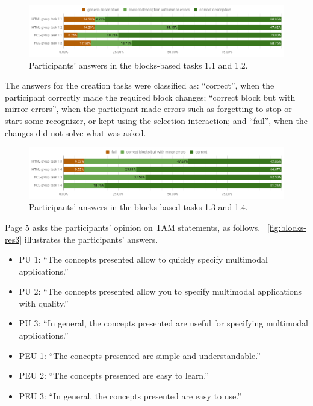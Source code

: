 \documentclass[
  doutorado,
  american
]{ThesisPUC}
\newcommand{\fig}[1]{\figurename~\ref{#1}}
\newcommand{\captionvspace}{\vspace{-1.3em}}
\begin{document}
\begin{figure}[!ht]
\begin{center}
	\includegraphics[width=14cm, keepaspectratio]{img/img20.png}
    \captionvspace
	\caption{Participants’ answers in the blocks-based tasks 1.1 and 1.2.}
	\label{fig:blocks-res1}
    \captionvspace
\end{center}
\end{figure}

The answers for the creation tasks were classified as: “correct”, when the
participant correctly made the required block changes; “correct block but with
mirror errors”, when the participant made errors such as forgetting to stop or
start some recognizer, or kept using the selection interaction; and “fail”, when
the changes did not solve what was asked.

\begin{figure}[!ht]
\begin{center}
	\includegraphics[width=14cm, keepaspectratio]{img/img21.png}
    \captionvspace
	\caption{Participants’ answers in the blocks-based tasks 1.3 and 1.4.}
	\label{fig:blocks-res2}
    \captionvspace
\end{center}
\end{figure}

Page 5 asks the participants’ opinion on TAM statements, as follows. 	
\fig{fig:blocks-res3} illustrates the participants’ answers.

\begin{itemize}
	\item PU 1: “The concepts presented allow to quickly specify multimodal
	applications.”
	\item PU 2: “The concepts presented allow you to specify multimodal
	applications with quality.”
	\item PU 3: “In general, the concepts presented are useful for specifying
	multimodal applications.”
	\item PEU 1: “The concepts presented are simple and understandable.”
	\item PEU 2: “The concepts presented are easy to learn.”
	\item PEU 3: “In general, the concepts presented are easy to use.”
\end{itemize}
\end{document}
